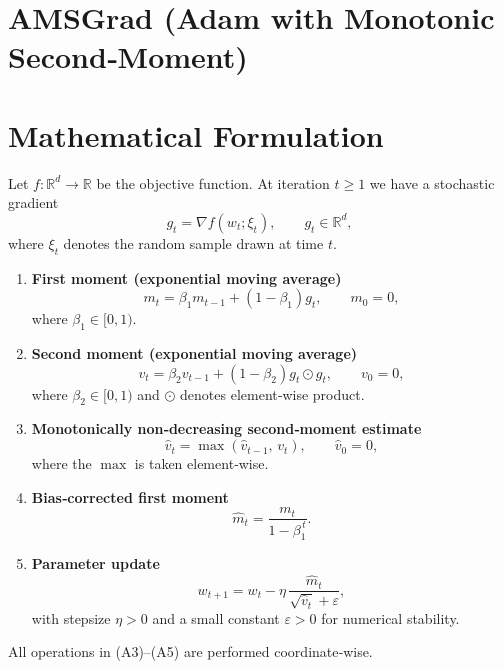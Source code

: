 \documentclass{article}
\newcommand{\R}{\mathbb{R}}
\begin{document}
\section*{AMSGrad (Adam with Monotonic Second‑Moment)}

\section*{Mathematical Formulation}
Let $f:\R^{d}\rightarrow\R$ be the objective function.  
At iteration $t\ge 1$ we have a stochastic gradient
\[
g_t = \nabla f(w_t; \xi_t),\qquad g_t\in\R^{d},
\]
where $\xi_t$ denotes the random sample drawn at time $t$.

\begin{enumerate}[label=\textbf{(A\arabic*)}, leftmargin=*, nosep]
\item \textbf{First moment (exponential moving average)}  
\[
m_t = \beta_1 m_{t-1} + (1-\beta_1) g_t,\qquad m_0 = 0,
\]
where $\beta_1\in[0,1)$.

\item \textbf{Second moment (exponential moving average)}  
\[
v_t = \beta_2 v_{t-1} + (1-\beta_2) g_t\odot g_t,\qquad v_0 = 0,
\]
where $\beta_2\in[0,1)$ and $\odot$ denotes element‑wise product.

\item \textbf{Monotonically non‑decreasing second‑moment estimate}  
\[
\hat v_t = \max(\hat v_{t-1},\, v_t),\qquad \hat v_0 = 0,
\]
where the $\max$ is taken element‑wise.

\item \textbf{Bias‑corrected first moment}  
\[
\hat m_t = \frac{m_t}{1-\beta_1^{\,t}}.
\]

\item \textbf{Parameter update}  
\[
w_{t+1}= w_t - \eta\,
\frac{\hat m_t}{\sqrt{\hat v_t} + \varepsilon},
\]
with stepsize $\eta>0$ and a small constant $\varepsilon>0$ for numerical stability.
\end{enumerate}

All operations in (A3)–(A5) are performed coordinate‑wise.
\end{document}
